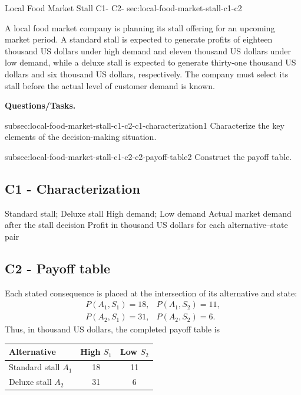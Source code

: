 	\sectionScored
	{Local Food Market Stall}
	{C1- \hspace{2mm} C2-}
	{sec:local-food-market-stall-c1-c2}
	{
		A local food market company is planning its stall offering for an upcoming market period. A standard stall is expected to generate profits of eighteen thousand US dollars under high demand and eleven thousand US dollars under low demand, while a deluxe stall is expected to generate thirty-one thousand US dollars and six thousand US dollars, respectively. The company must select its stall before the actual level of customer demand is known.
		
		\textbf{Questions/Tasks.}
		\begin{enumerate}
			\CriterionTask
			{subsec:local-food-market-stall-c1-c2-c1-characterization}{1}
			{Characterize the key elements of the decision-making situation. }
			
			\CriterionTask
			{subsec:local-food-market-stall-c1-c2-c2-payoff-table}{2}
			{Construct the payoff table. }
		\end{enumerate}
		
		\label{subsec:local-food-market-stall-c1-c2-c1-characterization}
		\subsection*{C1 - Characterization }
		
		\DecisionElementsTable
		{Standard stall; Deluxe stall}
		{High demand; Low demand}
		{Actual market demand after the stall decision}
		{Profit in thousand US dollars for each alternative--state pair}
		
		\label{subsec:local-food-market-stall-c1-c2-c2-payoff-table}
		\subsection*{C2 - Payoff table }
		
		Each stated consequence is placed at the intersection of its alternative and state:
		\[
		\begin{array}{ll}
			P(A_1,S_1)=18, & P(A_1,S_2)=11,\\
			P(A_2,S_1)=31, & P(A_2,S_2)=6.
		\end{array}
		\]
		Thus, in thousand US dollars, the completed payoff table is
		\begin{center}
			\begin{tabular}{lcc}
				\toprule
				Alternative & High \(S_1\) & Low \(S_2\)\\
				\midrule
				Standard stall \(A_1\) & 18 & 11\\
				Deluxe stall \(A_2\) & 31 & 6\\
				\bottomrule
			\end{tabular}
		\end{center}
		
		\vspace{-5mm}
		
	}
	
